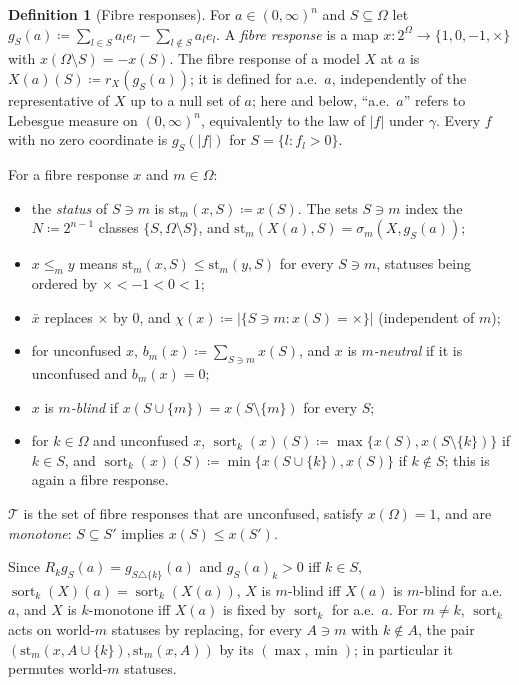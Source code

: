 \documentclass[11pt]{article}
\newcommand{\chg}[1]{{\color{red}#1}}
\theoremstyle{definition}
\newtheorem{definition}[theorem]{Definition}
\theoremstyle{remark}
\newcommand{\T}{\mathcal T}
\newcommand{\conf}{\times}
\begin{document}
\begin{definition}[Fibre responses]\label{def:fibres}
For $a\in(0,\infty)^n$ and $S\subseteq\Omega$ let $g_S(a)\coloneqq\sum_{l\in S}a_le_l-\sum_{l\notin S}a_le_l$. A \emph{fibre response} is a map $x:2^\Omega\to\{1,0,-1,\conf\}$ with $x(\Omega\setminus S)=-x(S)$. The fibre response of a model $X$ at $a$ is $X(a)(S)\coloneqq r_X(g_S(a))$; it is defined for a.e.\ $a$, independently of the representative of $X$ up to a null set of $a$\chg{; here and below, ``a.e.\ $a$'' refers to Lebesgue measure on $(0,\infty)^n$, equivalently to the law of $|f|$ under $\gamma$}. Every $f$ with no zero coordinate is $g_S(|f|)$ for $S=\{l:f_l>0\}$.

For a fibre response $x$ and $m\in\Omega$:
\begin{itemize}
\item the \emph{status} of $S\ni m$ is $\mathrm{st}_m(x,S)\coloneqq x(S)$. The sets $S\ni m$ index the $N\coloneqq2^{n-1}$ classes $\{S,\Omega\setminus S\}$, and $\mathrm{st}_m(X(a),S)=\sigma_m(X,g_S(a))$;
\item $x\le_my$ means $\mathrm{st}_m(x,S)\le\mathrm{st}_m(y,S)$ for every $S\ni m$\chg{, statuses being ordered by $\conf<-1<0<1$};
\item $\bar x$ replaces $\conf$ by $0$, and $\chi(x)\coloneqq|\{S\ni m:x(S)=\conf\}|$ (independent of $m$);
\item for unconfused $x$, $b_m(x)\coloneqq\sum_{S\ni m}x(S)$, and $x$ is \emph{$m$-neutral} if \chg{it is unconfused and} $b_m(x)=0$;
\item $x$ is \emph{$m$-blind} if $x(S\cup\{m\})=x(S\setminus\{m\})$ for every $S$;
\item for $k\in\Omega$ and unconfused $x$, $\operatorname{sort}_k(x)(S)\coloneqq\max\{x(S),x(S\setminus\{k\})\}$ if $k\in S$, and $\operatorname{sort}_k(x)(S)\coloneqq\min\{x(S\cup\{k\}),x(S)\}$ if $k\notin S$; this is again a fibre response.
\end{itemize}
$\T$ is the set of fibre responses that are unconfused, satisfy $x(\Omega)=1$, and are \emph{monotone}: $S\subseteq S'$ implies $x(S)\le x(S')$.
\end{definition}

\chg{Since $R_kg_S(a)=g_{S\triangle\{k\}}(a)$ and $g_S(a)_k>0$ iff $k\in S$,} $\operatorname{sort}_k(X)(a)=\operatorname{sort}_k(X(a))$, $X$ is $m$-blind iff $X(a)$ is $m$-blind for a.e.\ $a$, and $X$ is $k$-monotone iff $X(a)$ is fixed by $\operatorname{sort}_k$ for a.e.\ $a$. For $m\neq k$, $\operatorname{sort}_k$ acts on world-$m$ statuses by replacing, for every $A\ni m$ with $k\notin A$, the pair $(\mathrm{st}_m(x,A\cup\{k\}),\mathrm{st}_m(x,A))$ by its $(\max,\min)$; in particular it permutes world-$m$ statuses.
\end{document}
